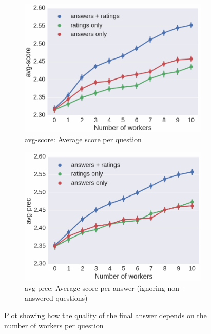 \begin{figure}[h!t]
  \begin{subfigure}[t]{0.5\textwidth}
	\centering
	\includegraphics[width=\textwidth]{img/crqa_nworkers_vs_accuracy}
	\caption{avg-score: Average score per question}
	\label{figure:crqa:nworkers_vs_accuracy}
  \end{subfigure}
  \begin{subfigure}[t]{0.5\textwidth}
	\centering
	\includegraphics[width=\textwidth]{img/crqa_nworkers_vs_precision}
	\caption{avg-prec: Average score per answer (ignoring non-answered questions)}
	\label{figure:crqa:nworkers_vs_precision}
  \end{subfigure}
	\caption{Plot showing how the quality of the final answer depends on the number of workers per question}
	\label{figure:crqa:nworkers_vs_quality}
\end{figure}

